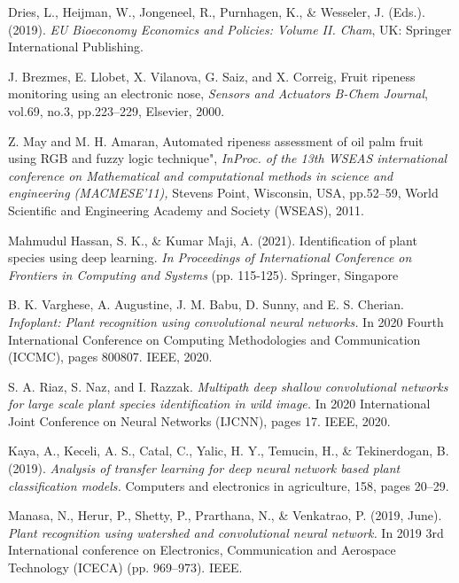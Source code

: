 
\begin{thebibliography}{9}

  Dries, L., Heijman, W., Jongeneel, R., Purnhagen, K., \& Wesseler, J. (Eds.). (2019). 
  \emph{EU Bioeconomy Economics and Policies: Volume II. Cham}, UK: Springer International Publishing.

  J. Brezmes, E. Llobet, X. Vilanova, G. Saiz, and X. Correig, Fruit ripeness monitoring using an electronic nose, 
  \emph{Sensors and Actuators B-Chem Journal}, vol.69, no.3, pp.223--229, Elsevier, 2000.

  Z. May and M. H. Amaran, Automated ripeness assessment of oil palm fruit using RGB and fuzzy logic technique", 
  \emph{InProc. of the 13th WSEAS international conference on Mathematical and computational methods in science and engineering (MACMESE'11),}
  Stevens Point, Wisconsin, USA, pp.52--59, World Scientific and Engineering Academy and Society (WSEAS), 2011.

  Mahmudul Hassan, S. K., \& Kumar Maji, A. (2021). Identification of plant species using deep learning. 
  \emph{In Proceedings of International Conference on Frontiers in Computing and Systems}
  (pp. 115-125). Springer, Singapore

  B. K. Varghese, A. Augustine, J. M. Babu, D. Sunny, and E. S. Cherian. 
  \emph{Infoplant: Plant recognition using convolutional neural networks.} 
  In 2020 Fourth International Conference on Computing Methodologies and 
  Communication (ICCMC), pages 800807. IEEE, 2020.

  S. A. Riaz, S. Naz, and I. Razzak. 
  \emph{Multipath deep shallow convolutional networks 
  for large scale plant species identification in wild image.}
  In 2020 International Joint Conference on Neural Networks (IJCNN), pages 17. IEEE, 2020.

  Kaya, A., Keceli, A. S., Catal, C., Yalic, H. Y., Temucin, H., \& Tekinerdogan, B. (2019). 
  \emph{Analysis of transfer learning for deep neural network based plant classification models.}
  Computers and electronics in agriculture, 158, pages 20--29.

  Manasa, N., Herur, P., Shetty, P., Prarthana, N., \& Venkatrao, P. (2019, June). 
  \emph{Plant recognition using watershed and convolutional neural network.}
  In 2019 3rd International conference on Electronics, Communication and Aerospace Technology 
  (ICECA) (pp. 969--973). IEEE.


\end{thebibliography}
